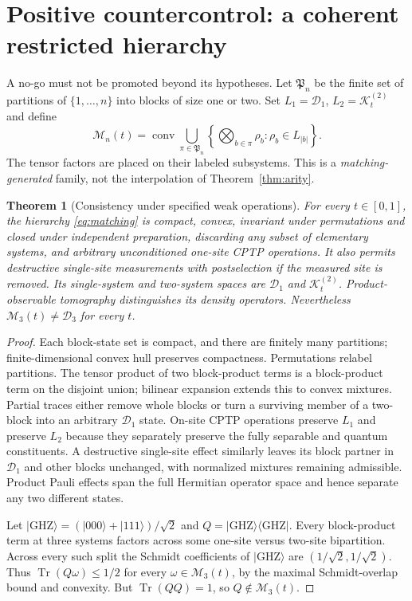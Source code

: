 \documentclass[10pt,letterpaper]{article}
\newtheorem{theorem}{Theorem}
\newcommand{\DD}{\mathcal D}
\newcommand{\KK}{\mathcal K}
\newcommand{\MM}{\mathcal M}
\newcommand{\tr}{\operatorname{Tr}}
\newcommand{\GHZ}{\mathrm{GHZ}}
\begin{document}
\section{Positive countercontrol: a coherent restricted hierarchy}
A no-go must not be promoted beyond its hypotheses. Let $\mathfrak P_n$
be the finite set of partitions of $\{1,\ldots,n\}$ into blocks of size
one or two. Set $L_1=\DD_1$, $L_2=\KK_t^{(2)}$ and define
\begin{equation}\label{eq:matching}
\MM_n(t)=\operatorname{conv}\bigcup_{\pi\in\mathfrak P_n}
\left\{\bigotimes_{b\in\pi}\rho_b:\rho_b\in L_{|b|}\right\}.
\end{equation}
The tensor factors are placed on their labeled subsystems. This is a
\emph{matching-generated} family, not the interpolation of
Theorem~\ref{thm:arity}.
\begin{theorem}[Consistency under specified weak operations]
\label{thm:matching}
For every $t\in[0,1]$, the hierarchy \eqref{eq:matching} is compact,
convex, invariant under permutations and closed under independent
preparation, discarding any subset of elementary systems, and arbitrary
\emph{unconditioned} one-site CPTP operations. It also permits destructive
single-site measurements with postselection \emph{if the measured site is
removed}. Its single-system and two-system spaces are $\DD_1$ and
$\KK_t^{(2)}$. Product-observable tomography distinguishes its density
operators. Nevertheless $\MM_3(t)\ne\DD_3$ for every $t$.
\end{theorem}
\begin{proof}
Each block-state set is compact, and there are finitely many partitions;
finite-dimensional convex hull preserves compactness. Permutations relabel
partitions. The tensor product of two block-product terms is a block-product
term on the disjoint union; bilinear expansion extends this to convex
mixtures. Partial traces either remove whole blocks or turn a surviving
member of a two-block into an arbitrary $\DD_1$ state. On-site CPTP
operations preserve $L_1$ and preserve $L_2$ because they separately
preserve the fully separable and quantum constituents. A destructive
single-site effect similarly leaves its block partner in $\DD_1$ and
other blocks unchanged, with normalized mixtures remaining admissible.
Product Pauli effects span the full Hermitian operator space and hence
separate any two different states.

Let $|\GHZ\rangle=(|000\rangle+|111\rangle)/\sqrt2$ and
$Q=|\GHZ\rangle\langle\GHZ|$. Every block-product term at three
systems factors across some one-site versus two-site bipartition. Across
every such split the Schmidt coefficients of $|\GHZ\rangle$ are
$(1/\sqrt2,1/\sqrt2)$. Thus $\tr(Q\omega)\le1/2$ for every
$\omega\in\MM_3(t)$, by the maximal Schmidt-overlap bound and convexity.
But $\tr(Q Q)=1$, so $Q\notin\MM_3(t)$.
\end{proof}
\end{document}
